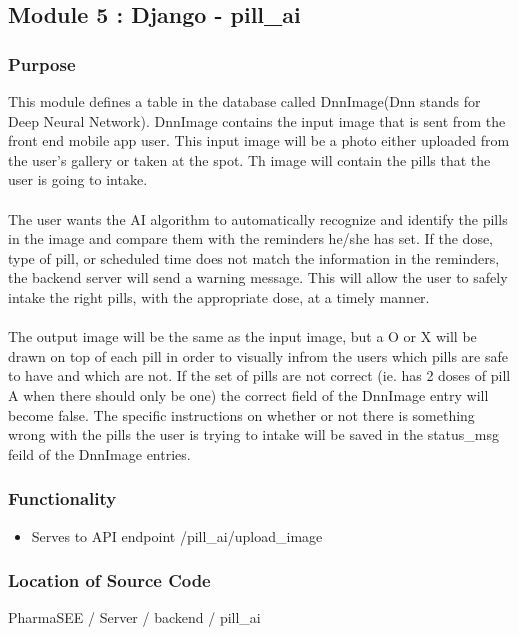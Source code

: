 \documentclass[conference]{IEEEtran}
\begin{document}
\subsection{Module 5 : Django - pill\_ai}
\subsubsection{Purpose}
This module defines a table in the database called DnnImage(Dnn stands for Deep Neural Network). DnnImage contains the input image that is sent from the front end mobile app user. This input image will be a photo either uploaded from the user's gallery or taken at the spot. Th image will contain the pills that the user is going to intake. \\ \\ 
The user wants the AI algorithm to automatically recognize and identify the pills in the image and compare them with the reminders he/she has set. If the dose, type of pill, or scheduled time does not match the information in the reminders, the backend server will send a warning message. This will allow the user to safely intake the right pills, with the appropriate dose, at a timely manner. \\ \\
The output image will be the same as the input image, but a O or X will be drawn on top of each pill in order to visually infrom the users which pills are safe to have and which are not. If the set of pills are not correct (ie. has 2 doses of pill A when there should only be one) the correct field of the DnnImage entry will become false. The specific instructions on whether or not there is something wrong with the pills the user is trying to intake will be saved in the status\_msg feild of the DnnImage entries.\\

\subsubsection{Functionality}
\begin{itemize}
    \item Serves to API endpoint /pill\_ai/upload\_image
\end{itemize}
\noindent
\newline

\subsubsection{Location of Source Code}
PharmaSEE / Server / backend / pill\_ai \\
\end{document}
